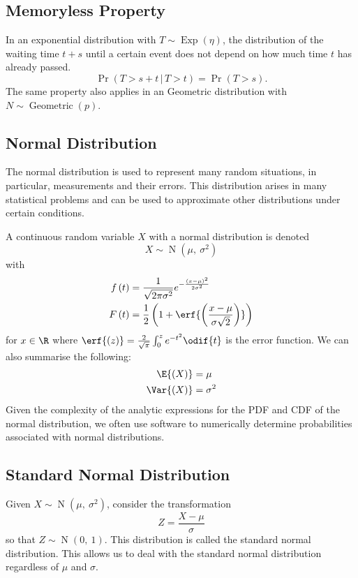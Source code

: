 \documentclass{article}
\begin{document}
\subsection{Memoryless Property}
In an exponential distribution with \(T \sim \operatorname{Exp}{\left( \eta \right)}\),
the distribution of the waiting time \(t + s\) until a certain event does not depend on
how much time \(t\) has already passed.
\begin{equation*}
    \Pr{\left( T > s + t \,\vert\, T > t \right)} = \Pr{\left( T > s \right)}.
\end{equation*}
The same property also applies in an Geometric distribution with \(N \sim \operatorname{Geometric}{\left( p \right)}\).
\subsection{Normal Distribution}
The normal distribution is used to represent many random situations, in particular, measurements and their errors.
This distribution arises in many statistical problems and can be used to \linebreak approximate other distributions
under certain conditions.

A continuous random variable \(X\) with a normal distribution is denoted
\begin{equation*}
    X \sim \operatorname{N}{\left( \mu,\: \sigma^2 \right)}
\end{equation*}
with
\begin{align*}
    f\left( t \right) & = \frac{1}{\sqrt{2 \pi \sigma^2}} e^{-\frac{\left( x - \mu \right)^2}{2 \sigma^2}}    \\
    F\left( t \right) & = \frac{1}{2} \left( 1 + \erf{\left( \frac{x - \mu}{\sigma \sqrt{2}} \right)} \right)
\end{align*}
for \(x \in \R\) where \(\erf{\left( z \right)} = \frac{2}{\sqrt{\pi}} \int_0^z e^{-t^2} \odif{t}\) is the error function.
We can also summarise the following:
\begin{align*}
    \E{\left( X \right)}   & = \mu      \\
    \Var{\left( X \right)} & = \sigma^2
\end{align*}
Given the complexity of the analytic expressions for the PDF and CDF of the normal distribution, we often
use software to numerically determine probabilities associated with normal distributions.
\subsection{Standard Normal Distribution}
Given \(X \sim \operatorname{N}{\left( \mu,\: \sigma^2 \right)}\), consider the transformation
\begin{equation*}
    Z = \frac{X - \mu}{\sigma}
\end{equation*}
so that \(Z \sim \operatorname{N}{\left( 0,\: 1 \right)}\). This distribution is called the standard normal distribution.
This allows us to deal with the standard normal distribution regardless of \(\mu\) and \(\sigma\).
\end{document}
